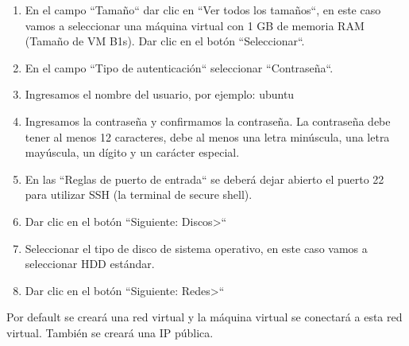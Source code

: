 \documentclass[11pt,a4paper,oneside]{book}
\begin{document}
\begin{enumerate}

\item En el campo ``Tamaño`` dar clic en ``Ver todos los tamaños``, en este caso vamos a seleccionar una máquina virtual con 1 GB de memoria RAM (Tamaño de VM B1s). Dar clic en el botón ``Seleccionar``.

\item En el campo ``Tipo de autenticación`` seleccionar ``Contraseña``.

\item Ingresamos el nombre del usuario, por ejemplo: ubuntu

\item Ingresamos la contraseña y confirmamos la contraseña. La contraseña debe tener al menos 12 caracteres, debe al menos una letra minúscula, una letra mayúscula, un dígito y un carácter especial.

\item En las ``Reglas de puerto de entrada`` se deberá dejar abierto el puerto 22 para utilizar SSH (la terminal de secure shell).

\item Dar clic en el botón ``Siguiente: Discos>``

\item Seleccionar el tipo de disco de sistema operativo, en este caso vamos a seleccionar HDD estándar.

\item Dar clic en el botón ``Siguiente: Redes>``

\end{enumerate}

Por default se creará una red virtual y la máquina virtual se conectará a esta red virtual. También se creará una IP pública.
\end{document}
